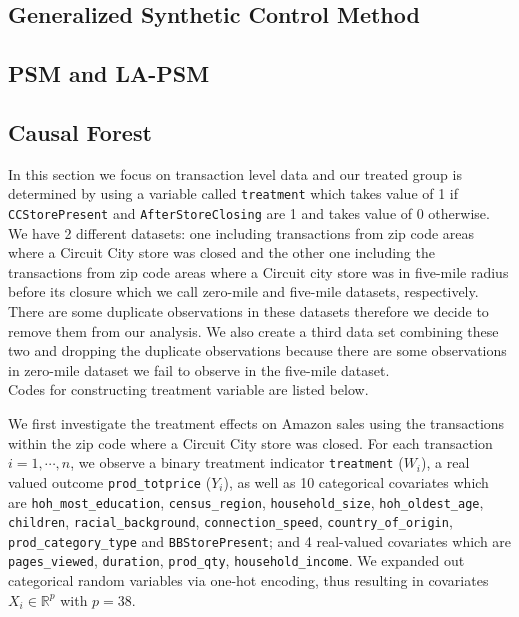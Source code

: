 \documentclass{article}
\begin{document}
\subsection{Generalized Synthetic Control Method}


\subsection{PSM and LA-PSM}


\subsection{Causal Forest}
In this section we focus on transaction level data and our treated group is determined by using a variable called \texttt{treatment} which takes value of 1 if \texttt{CCStorePresent} and \texttt{AfterStoreClosing} are 1 and takes value of 0 otherwise. We have 2 different datasets: one  including transactions from zip code areas where a Circuit City store was closed and the other one including the transactions from zip code areas where a Circuit city store was in five-mile radius before its closure which we call zero-mile and five-mile datasets, respectively. There are some duplicate observations in these datasets therefore we decide to remove them from our analysis. We also create a third data set combining these two and dropping the duplicate observations because there are some observations in zero-mile dataset we fail to observe in the five-mile dataset. \\

Codes for constructing treatment variable are listed below.


We first investigate the treatment effects on Amazon sales using the transactions within the zip code where a Circuit City store was closed. For each transaction $i=1, \cdots, n$, we observe a binary treatment indicator \texttt{treatment} ($W_i$), a real valued outcome \texttt{prod\_totprice} ($Y_i$), as well as 10 categorical covariates which are \texttt{hoh\_most\_education}, \texttt{census\_region}, \texttt{household\_size}, \texttt{hoh\_oldest\_age}, \texttt{children}, \texttt{racial\_background}, \texttt{connection\_speed}, \texttt{country\_of\_origin}, \texttt{prod\_category\_type} and \texttt{BBStorePresent}; and 4 real-valued covariates which are \texttt{pages\_viewed}, \texttt{duration}, \texttt{prod\_qty}, \texttt{household\_income}. We expanded out categorical random variables via one-hot encoding, thus resulting in covariates $X_i \in \mathbb{R}^p$  with $p = 38$. \\
\end{document}
